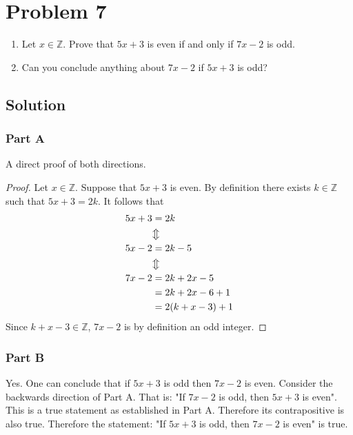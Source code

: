 \documentclass[12pt]{extarticle}
\begin{document}
\section*{Problem 7}

\begin{enumerate}[label=(\alph*)]
	\item Let $x \in \mathbb{Z}$. Prove that $5x + 3$ is even if and only if $7x - 2$ is odd.
	\item Can you conclude anything about $7x - 2$ if $5x + 3$ is odd?
\end{enumerate}

\subsection*{Solution}

\subsubsection*{Part A}

A direct proof of both directions.

\begin{proof}
	Let $x \in \mathbb{Z}$. Suppose that $5x+3$ is even. By definition there exists $k \in \mathbb{Z}$ such that $5x + 3 = 2k$. It follows that
	\begin{align*}
		5x + 3 &= 2k \\
					 &\big\Updownarrow \\
		5x - 2 &= 2k - 5 \\
					 &\big\Updownarrow \\
		7x - 2 &= 2k + 2x - 5 \\
					 &= 2k + 2x - 6 + 1 \\
					 &= 2(k + x - 3) + 1 \\
	\end{align*}
	Since $k + x - 3 \in \mathbb{Z}$, $7x-2$ is by definition an odd integer.
\end{proof}

\subsubsection*{Part B}

Yes. One can conclude that if $5x + 3$ is odd then $7x-2$ is even. Consider the backwards direction of Part A. That is: "If $7x-2$ is odd, then $5x + 3$ is even". This is a true statement as established in Part A. Therefore its contrapositive is also true. Therefore the statement: "If $5x + 3$ is odd, then $7x - 2$ is even" is true.
\end{document}
